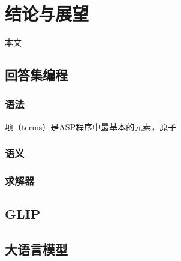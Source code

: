 \chapter{结论与展望}
本文
\section{回答集编程}
\subsection{语法}
项（terms）是ASP程序中最基本的元素，原子
\subsection{语义}
\subsection{求解器}
\section{GLIP}
\section{大语言模型}